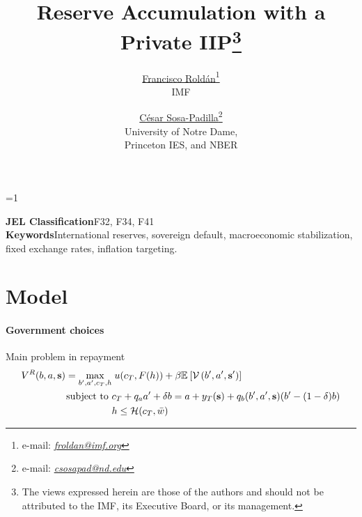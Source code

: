
\linespread{1.32} %

\def\acknowledgements{}

\title{Reserve Accumulation with a Private IIP\thanks{The views expressed herein are those of the authors and should not be attributed to the IMF, its Executive Board, or its management. \acknowledgements}}

\author{\href{https://fqroldan.github.io}{Francisco Rold\'{a}n}\thanks{e-mail: \href{mailto:froldan@imf.org}{\emph{froldan@imf.org}}}\\IMF \and \href{https://sosapadilla.github.io}{C\'{e}sar Sosa-Padilla}\thanks{e-mail: \href{mailto:csosapad@nd.edu}{\emph{csosapad@nd.edu}}} \\University of Notre Dame,\\ Princeton IES, and NBER}

\ifdefined\ungated
\else
\def\ungated{1}
\fi

\date{\monthname\xspace \the\year %
}


\ifnum\ungated=1%
	\maketitle 
	\begin{abstract}
		\noindent
	\end{abstract}
	\vfill
	\noindent\textbf{JEL Classification}\quad F32, F34, F41\\
	\noindent\textbf{Keywords}\quad International reserves, sovereign default, macroeconomic stabilization, fixed exchange rates, inflation targeting.
	\bigskip
	\vfill
\else
	
	\tableofcontents
\fi
\pagebreak 



\section{Model}

\paragraph{Government choices}

Main problem in repayment
\begin{align}
	V^R(b,a,\text{\textbf{s}}) = \max_{b',a',c_T, h} &\; u(c_T, F(h)) + \beta \mathbb{E}_{{}}\left[ \mathcal{V}\left(b',a',\text{\textbf{s}}'\right) \right] \\
	\text{subject to }
	& c_T + q_a a' + \delta b = a + y_T(\text{\textbf{s}}) + q_b(b',a',\text{\textbf{s}}) (b' - (1-\delta) b) \notag\\
	& h \leq \mathcal{H}(c_T, \bar{w}) \notag
\end{align}

